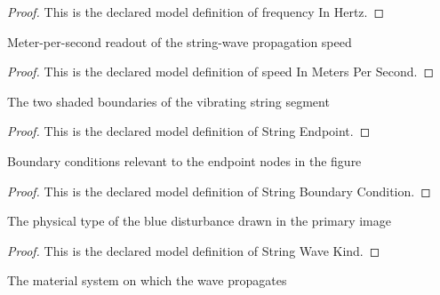 \begin{proof}
  This is the declared model definition of frequency In Hertz.
\end{proof}
\begin{definition}
  \label{def:physics:phyx-mini-0176:phyxminiproblems-problemphyxmini0176-speedinmeterspersecond}
  Meter-per-second readout of the string-wave propagation speed
\end{definition}
\begin{proof}
  This is the declared model definition of speed In Meters Per Second.
\end{proof}
\begin{definition}
  \label{def:physics:phyx-mini-0176:phyxminiproblems-problemphyxmini0176-stringendpoint}
  The two shaded boundaries of the vibrating string segment
\end{definition}
\begin{proof}
  This is the declared model definition of String Endpoint.
\end{proof}
\begin{definition}
  \label{def:physics:phyx-mini-0176:phyxminiproblems-problemphyxmini0176-stringboundarycondition}
  Boundary conditions relevant to the endpoint nodes in the figure
\end{definition}
\begin{proof}
  This is the declared model definition of String Boundary Condition.
\end{proof}
\begin{definition}
  \label{def:physics:phyx-mini-0176:phyxminiproblems-problemphyxmini0176-stringwavekind}
  The physical type of the blue disturbance drawn in the primary image
\end{definition}
\begin{proof}
  This is the declared model definition of String Wave Kind.
\end{proof}
\begin{definition}
  \label{def:physics:phyx-mini-0176:phyxminiproblems-problemphyxmini0176-wavemediumkind}
  The material system on which the wave propagates
\end{definition}
